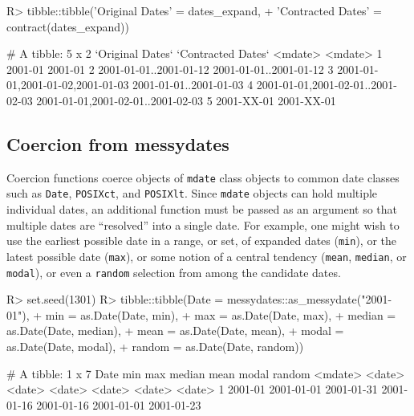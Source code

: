 \documentclass[
]{jss}
\begin{document}
\begin{CodeChunk}
\begin{CodeInput}
R> tibble::tibble('Original Dates' = dates_expand,
+                'Contracted Dates' = contract(dates_expand))
\end{CodeInput}
\begin{CodeOutput}
# A tibble: 5 x 2
  `Original Dates`                    `Contracted Dates`                 
  <mdate>                             <mdate>                            
1 2001-01                             2001-01                            
2 2001-01-01..2001-01-12              2001-01-01..2001-01-12             
3 {2001-01-01,2001-01-02,2001-01-03}  2001-01-01..2001-01-03             
4 {2001-01-01,2001-02-01..2001-02-03} {2001-01-01,2001-02-01..2001-02-03}
5 2001-XX-01                          2001-XX-01                         
\end{CodeOutput}
\end{CodeChunk}

\hypertarget{coercion-from-messydates}{%
\subsection{Coercion from messydates}\label{coercion-from-messydates}}

Coercion functions coerce objects of \texttt{mdate} class objects to
common date classes such as \texttt{Date}, \texttt{POSIXct}, and
\texttt{POSIXlt}. Since \texttt{mdate} objects can hold multiple
individual dates, an additional function must be passed as an argument
so that multiple dates are ``resolved'' into a single date. For example,
one might wish to use the earliest possible date in a range, or set, of
expanded dates (\texttt{min}), or the latest possible date
(\texttt{max}), or some notion of a central tendency (\texttt{mean},
\texttt{median}, or \texttt{modal}), or even a \texttt{random} selection
from among the candidate dates.

\begin{CodeChunk}
\begin{CodeInput}
R> set.seed(1301)
R> tibble::tibble(Date = messydates::as_messydate("2001-01"),
+                min = as.Date(Date, min),
+                max = as.Date(Date, max),
+                median = as.Date(Date, median),
+                mean = as.Date(Date, mean),
+                modal = as.Date(Date, modal),
+                random = as.Date(Date, random))
\end{CodeInput}
\begin{CodeOutput}
# A tibble: 1 x 7
  Date    min        max        median     mean       modal      random    
  <mdate> <date>     <date>     <date>     <date>     <date>     <date>    
1 2001-01 2001-01-01 2001-01-31 2001-01-16 2001-01-16 2001-01-01 2001-01-23
\end{CodeOutput}
\end{CodeChunk}
\end{document}
